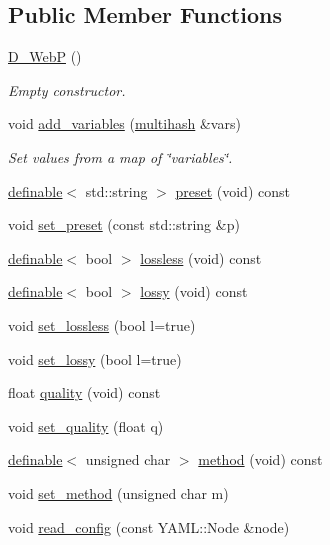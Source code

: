 \subsection*{Public Member Functions}
\begin{DoxyCompactItemize}
\item 
\hyperlink{class_photo_finish_1_1_d___web_p_a843064e953a4d950d9197b6cc597113f}{D\+\_\+\+WebP} ()
\begin{DoxyCompactList}\small\item\em Empty constructor. \end{DoxyCompactList}\item 
void \hyperlink{class_photo_finish_1_1_d___web_p_a2e30cd1b962996b759cd72046347642b}{add\+\_\+variables} (\hyperlink{namespace_photo_finish_a6f41796f162687538b7da5c7a95e2d18}{multihash} \&vars)
\begin{DoxyCompactList}\small\item\em Set values from a map of \char`\"{}variables\char`\"{}. \end{DoxyCompactList}\item 
\hyperlink{class_photo_finish_1_1definable}{definable}$<$ std\+::string $>$ \hyperlink{class_photo_finish_1_1_d___web_p_a16566874dd895f0d5c2f582945c51b4a}{preset} (void) const
\item 
void \hyperlink{class_photo_finish_1_1_d___web_p_a7fdfe35c27107b3e98bbe19578ec16a4}{set\+\_\+preset} (const std\+::string \&p)
\item 
\hyperlink{class_photo_finish_1_1definable}{definable}$<$ bool $>$ \hyperlink{class_photo_finish_1_1_d___web_p_af4ff4e0d51352703e5a0231ab9beaf41}{lossless} (void) const
\item 
\hyperlink{class_photo_finish_1_1definable}{definable}$<$ bool $>$ \hyperlink{class_photo_finish_1_1_d___web_p_ae2e1a50d282d116ca6a092204c57e20e}{lossy} (void) const
\item 
void \hyperlink{class_photo_finish_1_1_d___web_p_a8aff5931e79d1877fd545feb427f10b4}{set\+\_\+lossless} (bool l=true)
\item 
void \hyperlink{class_photo_finish_1_1_d___web_p_aff0d7ccdf128f2eec01612518b1e79f2}{set\+\_\+lossy} (bool l=true)
\item 
float \hyperlink{class_photo_finish_1_1_d___web_p_aefa18f92529cd3647eab20d394622dfb}{quality} (void) const
\item 
void \hyperlink{class_photo_finish_1_1_d___web_p_ac3f3418ca2503b73744d1649445b3771}{set\+\_\+quality} (float q)
\item 
\hyperlink{class_photo_finish_1_1definable}{definable}$<$ unsigned char $>$ \hyperlink{class_photo_finish_1_1_d___web_p_aa465397235a743aeb0a0db57f488090b}{method} (void) const
\item 
void \hyperlink{class_photo_finish_1_1_d___web_p_ac82c4f38c4ee55166cd446cf7badf405}{set\+\_\+method} (unsigned char m)
\item 
void \hyperlink{class_photo_finish_1_1_d___web_p_a813f83cc20ca13fc5301e5d5fde3ab54}{read\+\_\+config} (const Y\+A\+M\+L\+::\+Node \&node)
\end{DoxyCompactItemize}
